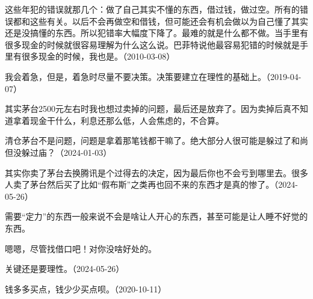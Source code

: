 这些年犯的错误就那几个：做了自己其实不懂的东西，借过钱，做过空。所有的错误都和这些有关。以后不会再做空和借钱，但可能还会有机会做以为自己懂了其实还是没搞懂的东西。所以犯错率大幅度下降了。最难的就是什么都不做。当手里有很多现金的时候就很容易理解为什么这么说。巴菲特说他最容易犯错的时候就是手里有很多现金的时候，我也是。（2010-03-08）


我会着急，但是，着急时尽量不要决策。决策要建立在理性的基础上。（2019-04-07）

其实茅台2500元左右时我也想过卖掉的问题，最后还是放弃了。因为卖掉后真不知道拿着现金干什么，利息还那么低，人会焦虑的，不合算。

清仓茅台不是问题，问题是拿着那笔钱都干嘛了。绝大部分人很可能是躲过了和尚但没躲过庙？（2024-01-03）

其实你卖了茅台去换腾讯是个过得去的决定，因为最后你也不会亏到哪里去。很多人卖了茅台然后买了比如“假布斯”之类再也回不来的东西才是真的惨了。（2024-05-26）


需要“定力”的东西一般来说不会是啥让人开心的东西，甚至可能是让人睡不好觉的东西。


嗯嗯，尽管找借口吧！对你没啥好处的。


关键还是要理性。（2024-05-26）


钱多多买点，钱少少买点呗。（2020-10-11）
